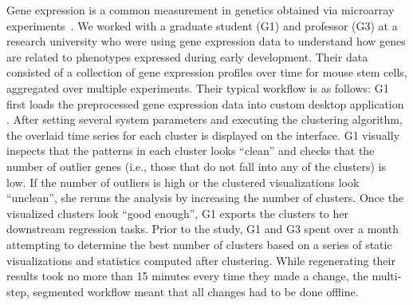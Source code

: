 \par\noindent{} Gene expression is a common measurement in genetics obtained via microarray experiments~\cite{Peng2016}.  We worked with a graduate student (G1) and professor (G3) at a research university who were using gene expression data to understand how genes are related to phenotypes expressed during early  development. Their data consisted of a collection of gene expression profiles over time for mouse stem cells, aggregated over multiple experiments. %
\npar Their typical workflow is as follows: G1 first loads the preprocessed gene expression data into custom desktop application . After setting several system parameters and executing the clustering algorithm, the overlaid time series for each cluster is displayed on the interface. G1 visually inspects that the patterns in each cluster looks ``clean'' and checks that the number of outlier genes (i.e., those that do not fall into any of the clusters) is low.  If the number of outliers is high or the clustered visualizations look ``unclean'', she reruns the analysis by increasing the number of clusters. Once the visualized clusters look ``good enough'', G1 exports the clusters to her downstream regression tasks.
\npar Prior to the study, G1 and G3 spent over a month attempting to determine the best number of clusters based on a series of static visualizations and statistics computed after clustering. While regenerating their results took no more than 15 minutes every time they made a change, the multi-step, segmented workflow meant that all changes had to be done offline. 
